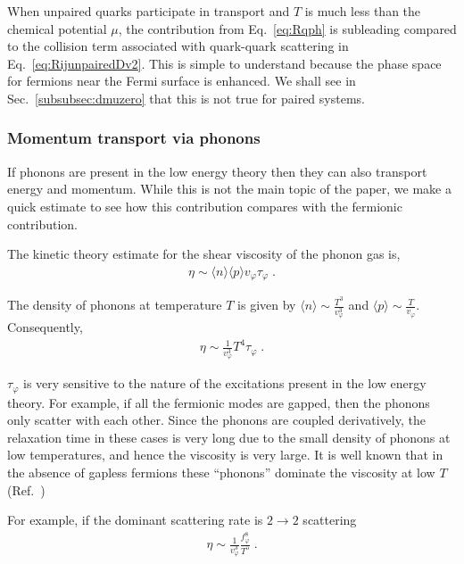 \documentclass[10pt, aps, prd, superscriptaddress, nofootinbib, 
               amsmath, amssymb, twocolumn,
               preprintnumbers, showpacs,
               raggedbottom,
               floatfix]{revtex4-1}
\begin{document}
When unpaired quarks participate in transport and $T$ is much
less than the chemical potential $\mu$, the contribution from Eq.~\ref{eq:Rqph}
is subleading compared to the collision term associated with quark-quark
scattering in Eq.~\ref{eq:RijunpairedDv2}.  This is simple to understand because
the phase space for fermions near the Fermi surface is enhanced. We shall see
in Sec.~\ref{subsubsec:dmuzero} that this is not true for paired systems.

\subsubsection{Momentum transport via phonons}
\label{sec:phonon_transport}
If phonons are present in the low energy theory then they can also transport
energy and momentum. While this is not the main topic of the paper, we make a
quick estimate to see how this contribution compares with the fermionic
contribution.

The kinetic theory estimate for the shear viscosity of the phonon gas is,
\begin{equation}
\begin{split}
\eta\sim \langle n\rangle \langle p\rangle v_\varphi \tau_\varphi\;.
\end{split}
\end{equation}

The density of phonons at temperature $T$ is given by $\langle n \rangle\sim
\frac{T^3}{v_\varphi^3} $ and $\langle p \rangle\sim \frac{T}{v_\varphi}$.
Consequently,
\begin{equation}
\begin{split}
\eta\sim \frac{1}{v_\varphi^3} T^4 \tau_\varphi\;.
\end{split}
\end{equation}

$\tau_\varphi$ is very sensitive to the nature of the excitations present in
the low energy theory. For example, if all the fermionic modes are gapped, then
the phonons only scatter with each other. Since the phonons are coupled
derivatively, the relaxation time in these cases is very long due to the small
density of phonons at low temperatures, and hence the viscosity is very large.
It is well known that in the absence of gapless fermions these ``phonons''
dominate the viscosity at low $T$
(Ref.~\cite{landau1949theory,maris1973hydrodynamics})

For example, if the dominant scattering rate is $2\rightarrow 2$ scattering
~\cite{Rupak:2007vp,Manuel:2011ed} 
\begin{equation}
\begin{split}
\eta\sim  \frac{1}{v_\varphi^3} \frac{f_\varphi^8}{T^5} \;.
\label{eq:etaphph}
\end{split}
\end{equation}
\end{document}
